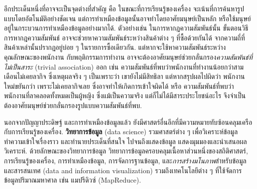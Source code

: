 อีกประเด็นหนึ่งที่อาจจะเป็นจุดต่างที่สำคัญ คือ ในขณะที่การเรียนรู้ของเครื่อง จะเน้นที่การค้นหารูปแบบโดยอัตโนมัติอย่างชัดเจน
แต่การทำเหมืองข้อมูลนั้นอาจทำโดยอาศัยมนุษย์เป็นหลัก
หรือใช้มนุษย์อยู่ในกระบวนการทำเหมืองข้อมูลอย่างมากได้.
ตัวอย่างเช่น ในการหากฎความสัมพันธ์นั้น ขั้นตอนวิธีการหากฎความสัมพันธ์ อาจจะช่วยหาความสัมพันธ์ระหว่างสินค้าต่าง ๆ ที่ซื้อด้วยกันได้
จากความถี่ที่สินค้าเหล่านั้นปรากฏอยู่บ่อย ๆ ในรายการซื้อเดียวกัน.
แต่หากจะใช้หาความสัมพันธ์ระหว่างคุณลักษณะของพนักงาน
กับพฤติกรรมการทำงาน
อาจจะต้องอาศัยมนุษย์ช่วยกลั่นกรอง\textit{ความสัมพันธ์ที่ไม่เป็นสาระ} (trivial association) ออก 
เช่น 
ความสัมพันธ์ที่พบว่าพนักงานที่ทำงานน้อยกว่าสามเดือนไม่เคยลากิจ 
ซึ่งเหตุผลจริง ๆ เป็นเพราะว่า เขายังไม่มีสิทธิลา 
แต่หากสรุปผลไปผิดว่า พนักงานใหม่ขยันกว่า เพราะไม่เคยลากิจเลย 
ซึ่งอาจทำให้เกิดการเข้าใจผิดได้ หรือ 
ความสัมพันธ์ที่พบว่าพนักงานที่ลาคลอดทั้งหมดเป็นผู้หญิง 
ซึ่งแม้เป็นความจริง แต่ก็ไม่ได้มีสาระประโยชน์อะไร จึงจำเป็นต้องอาศัยมนุษย์ช่วยกลั่นกรองรูปแบบความสัมพันธ์ที่พบ.

%
%
%

นอกจากปัญญาประดิษฐ์
และการทำเหมืองข้อมูลแล้ว
ยังมีศาสตร์อื่นอีกที่มีความหมายทับซ้อนคลุมเครือกับการเรียนรู้ของเครื่อง.
\textbf{วิทยาการข้อมูล} (data science)
รวมศาสตร์ต่าง ๆ
เพื่อวิเคราะห์ข้อมูล ทำความเข้าใจเรื่องราว และทำนายประเด็นที่สนใจ
ไปจนถึงแสดงข้อมูล แสดงมุมมองและนำเสนอผลวิเคราะห์.
ด้วยลักษณะของวิทยาการข้อมูล
วิทยาการข้อมูลครอบคลุมเนื้อหาส่วนหนึ่งของสถิติศาสตร์,
การเรียนรู้ของเครื่อง,
การทำเหมืองข้อมูล,
การจัดการฐานข้อมูล,
และ\textit{การสร้างมโนภาพ}สำหรับข้อมูลและสารสนเทศ
(data and information visualization)
รวมถึงเทคโนโลยีต่าง ๆ ที่ใช้จัดการข้อมูลปริมาณมหาศาล 
เช่น แมปรีดิวซ์ (MapReduce).
%

